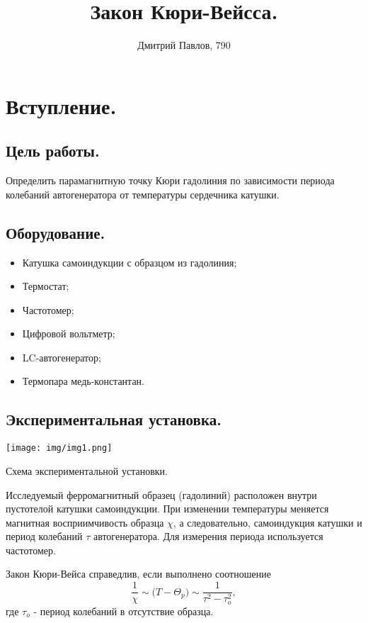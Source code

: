 \documentclass[12pt,a4paper]{article}
\author{Дмитрий Павлов, 790}
\title {\textbf{Закон Кюри-Вейсса.}}
\begin{document}
\maketitle
\newpage
\tableofcontents 

\newpage

\section{Вступление.}
    \subsection{Цель работы.}
        Определить парамагнитную точку Кюри гадолиния по зависимости периода колебаний автогенератора от температуры сердечника катушки.
        
    \subsection{Оборудование.}
        \begin{itemize}
            \item Катушка самоиндукции с образцом из гадолиния;
            \item Термостат;
            \item Частотомер;
            \item Цифровой вольтметр;
            \item LC-автогенератор;
            \item Термопара медь-константан.
        \end{itemize}

    \subsection{Экспериментальная установка.}
        \begin{center}
            \texttt{[image: img/img1.png]}
            
            Схема экспериментальной установки.
         \end{center}
         
        Исследуемый ферромагнитный образец (гадолиний) расположен внутри пустотелой катушки самоиндукции. При изменении температуры меняется магнитная восприимчивость образца $\chi$, а следовательно, самоиндукция катушки и период колебаний $\tau$ автогенератора. Для измерения периода используется частотомер.
        
        Закон Кюри-Вейса справедлив, если выполнено соотношение
        \begin{equation}
            \dfrac{1}{\chi} \sim \big(T - \Theta_p\big) \sim \dfrac{1}{\tau^2-\tau_o^2},
        \end{equation}
        где $\tau_o$ - период колебаний в отсутствие образца.
\end{document}
